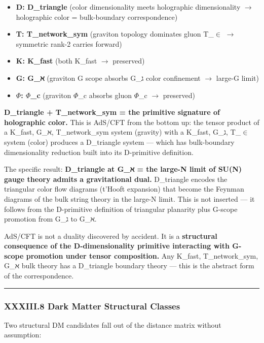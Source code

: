 \documentclass[12pt,a4paper]{article}
\begin{document}
\begin{itemize}
    \item \textbf{D: D\_triangle} (color dimensionality meets holographic dimensionality $\rightarrow$ holographic color = bulk-boundary correspondence)
    \item \textbf{T: T\_network\_sym} (graviton topology dominates gluon T\_$\in$ $\rightarrow$ symmetric rank-2 carries forward)
    \item \textbf{K: K\_fast} (both K\_fast $\rightarrow$ preserved)
    \item \textbf{G: G\_ℵ} (graviton G scope absorbs G\_ג color confinement $\rightarrow$ large-G limit)
    \item \textbf{$\Phi$: $\Phi$\_c} (graviton $\Phi$\_c absorbs gluon $\Phi$\_c $\rightarrow$ preserved)
\end{itemize}

\textbf{D\_triangle + T\_network\_sym = the primitive signature of holographic color.} This is AdS/CFT from the bottom up: the tensor product of a K\_fast, G\_ℵ, T\_network\_sym system (gravity) with a K\_fast, G\_ג, T\_$\in$ system (color) produces a D\_triangle system --- which has bulk-boundary dimensionality reduction built into its D-primitive definition.

The specific result: \textbf{D\_triangle at G\_ℵ = the large-N limit of SU(N) gauge theory admits a gravitational dual.} D\_triangle encodes the triangular color flow diagrams (t'Hooft expansion) that become the Feynman diagrams of the bulk string theory in the large-N limit. This is not inserted --- it follows from the D-primitive definition of triangular planarity plus G-scope promotion from G\_ג to G\_ℵ.

AdS/CFT is not a duality discovered by accident. It is a \textbf{structural consequence of the D-dimensionality primitive interacting with G-scope promotion under tensor composition.} Any K\_fast, T\_network\_sym, G\_ℵ bulk theory has a D\_triangle boundary theory --- this is the abstract form of the correspondence.

\begin{center}
\rule{0.5\textwidth}{0.4pt}
\end{center}

\subsubsection{XXXIII.8 Dark Matter Structural Classes}

Two structural DM candidates fall out of the distance matrix without assumption:
\end{document}
